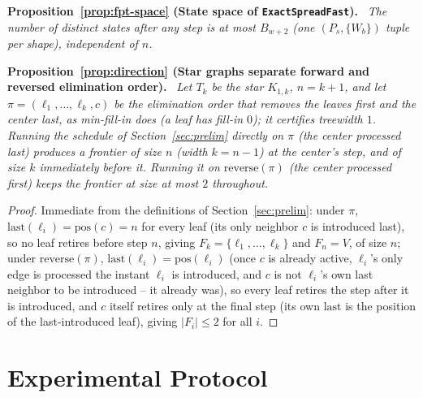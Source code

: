 \documentclass[preprint,11pt]{elsarticle}
\theoremstyle{definition}
\theoremstyle{remark}
\newenvironment{repeatproposition}[1][]{\par\medskip\noindent\textbf{#1.}\ \itshape}{\par\medskip}
\begin{document}
\begin{repeatproposition}[Proposition~\ref{prop:fpt-space} (State space of \texttt{ExactSpreadFast})]
The number of distinct states after any step is at most $B_{w+2}$ (one
$(P_s,\{W_b\})$ tuple per shape), independent of $n$.
\end{repeatproposition}

\begin{repeatproposition}[Proposition~\ref{prop:direction} (Star graphs separate forward and reversed elimination order)]
Let $T_k$ be the star $K_{1,k}$, $n=k+1$, and let
$\pi=(\ell_1,\dots,\ell_k,c)$ be the elimination order that removes the
leaves first and the center last, as min-fill-in does (a leaf has fill-in $0$); it certifies
treewidth $1$. Running the schedule of Section~\ref{sec:prelim} directly on
$\pi$ (the center processed last) produces a frontier of size $n$ (width $k=n-1$) at the center's step,
and of size $k$ immediately before it. Running it on $\mathrm{reverse}(\pi)$
(the center processed first) keeps the frontier at size at most $2$
throughout.
\end{repeatproposition}
\begin{proof}
Immediate from the definitions of Section~\ref{sec:prelim}: under $\pi$,
$\mathrm{last}(\ell_i)=\mathrm{pos}(c)=n$ for every leaf (its only neighbor
$c$ is introduced last), so no leaf retires before step $n$, giving
$F_k=\{\ell_1,\dots,\ell_k\}$ and $F_n=V$, of size $n$; under $\mathrm{reverse}(\pi)$,
$\mathrm{last}(\ell_i)=\mathrm{pos}(\ell_i)$ (once $c$ is already active,
$\ell_i$'s only edge is processed the instant $\ell_i$ is introduced, and
$c$ is not $\ell_i$'s own last neighbor to be introduced -- it already was),
so every leaf retires the step after it is introduced, and $c$ itself
retires only at the final step (its own $\mathrm{last}$ is the position of
the last-introduced leaf), giving $|F_i|\le 2$ for all $i$.
\end{proof}

\section{Experimental Protocol}\label{ec:reproducibility}
\end{document}
